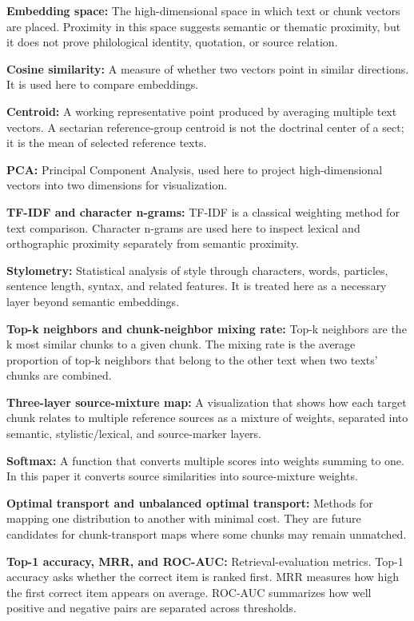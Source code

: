 \documentclass[uplatex,dvipdfmx,11pt,a4paper]{jsarticle}
\begin{document}
\noindent\textbf{Embedding space:} The high-dimensional space in which text or chunk vectors are placed. Proximity in this space suggests semantic or thematic proximity, but it does not prove philological identity, quotation, or source relation.

\noindent\textbf{Cosine similarity:} A measure of whether two vectors point in similar directions. It is used here to compare embeddings.

\noindent\textbf{Centroid:} A working representative point produced by averaging multiple text vectors. A sectarian reference-group centroid is not the doctrinal center of a sect; it is the mean of selected reference texts.

\noindent\textbf{PCA:} Principal Component Analysis, used here to project high-dimensional vectors into two dimensions for visualization\cite{jolliffe2002,pedregosa2011}.

\noindent\textbf{TF-IDF and character n-grams:} TF-IDF is a classical weighting method for text comparison\cite{salton1988}. Character n-grams are used here to inspect lexical and orthographic proximity separately from semantic proximity.

\noindent\textbf{Stylometry:} Statistical analysis of style through characters, words, particles, sentence length, syntax, and related features. It is treated here as a necessary layer beyond semantic embeddings.

\noindent\textbf{Top-k neighbors and chunk-neighbor mixing rate:} Top-k neighbors are the k most similar chunks to a given chunk. The mixing rate is the average proportion of top-k neighbors that belong to the other text when two texts' chunks are combined.

\noindent\textbf{Three-layer source-mixture map:} A visualization that shows how each target chunk relates to multiple reference sources as a mixture of weights, separated into semantic, stylistic/lexical, and source-marker layers.

\noindent\textbf{Softmax:} A function that converts multiple scores into weights summing to one. In this paper it converts source similarities into source-mixture weights.

\noindent\textbf{Optimal transport and unbalanced optimal transport:} Methods for mapping one distribution to another with minimal cost. They are future candidates for chunk-transport maps where some chunks may remain unmatched.

\noindent\textbf{Top-1 accuracy, MRR, and ROC-AUC:} Retrieval-evaluation metrics. Top-1 accuracy asks whether the correct item is ranked first. MRR measures how high the first correct item appears on average. ROC-AUC summarizes how well positive and negative pairs are separated across thresholds.
\end{document}
